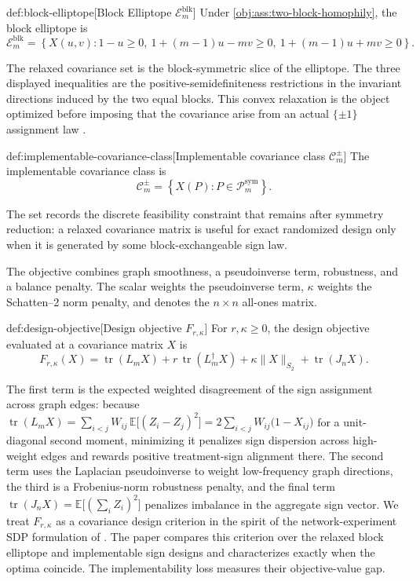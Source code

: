 \documentclass[11pt]{article}
\begin{document}
\begin{definitionv}{def:block-elliptope}[Block Elliptope \(\mathcal E_m^{\mathrm{blk}}\)]
Under \cref{obj:ass:two-block-homophily}, the block elliptope is
\[
\mathcal E_m^{\mathrm{blk}}
=
\left\{
X(u,v):
1-u\ge 0,\ 
1+(m-1)u-mv\ge 0,\ 
1+(m-1)u+mv\ge 0
\right\}.
\]
\end{definitionv}

The relaxed covariance set  is the block-symmetric slice of the elliptope. The three displayed inequalities are the positive-semidefiniteness restrictions in the invariant directions induced by the two equal blocks. This convex relaxation is the object optimized before imposing that the covariance arise from an actual \(\{\pm1\}\) assignment law \citep{boyd2004,thiyageswaran2026}.

\begin{definitionv}{def:implementable-covariance-class}[Implementable covariance class $\mathcal C_m^{\pm}$]
The implementable covariance class is
\[
\mathcal C_m^{\pm}
=
\left\{
X(P): P\in \mathcal P_m^{\mathrm{sym}}
\right\}.
\]
\end{definitionv}

The set  records the discrete feasibility constraint that remains after symmetry reduction: a relaxed covariance matrix is useful for exact randomized design only when it is generated by some block-exchangeable sign law.

The objective combines graph smoothness, a pseudoinverse term, robustness, and a balance penalty. The scalar \leanref{sym:r}{\ensuremath{r}} weights the pseudoinverse term, \(\kappa\) weights the Schatten--2 norm penalty, and \leanref{sym:J_n}{\ensuremath{J_n}} denotes the \(n\times n\) all-ones matrix.

\begin{definitionv}{def:design-objective}[Design objective $F_{r,\kappa}$]
For $r,\kappa\ge 0$, the design objective evaluated at a covariance matrix $X$ is
\[
F_{r,\kappa}(X)
=
\operatorname{tr}(L_m X)
+
r\,\operatorname{tr}(L_m^\dagger X)
+
\kappa \|X\|_{S_2}
+
\operatorname{tr}(J_n X).
\]
\end{definitionv}

The first term is the expected weighted disagreement of the sign assignment across graph edges: because $\operatorname{tr}(L_m X)=\sum_{i<j}W_{ij}\,\mathbb E\bigl[(Z_i-Z_j)^2\bigr]=2\sum_{i<j}W_{ij}\bigl(1-X_{ij}\bigr)$ for a unit-diagonal second moment, minimizing it penalizes sign dispersion across high-weight edges and rewards positive treatment-sign alignment there. The second term uses the Laplacian pseudoinverse to weight low-frequency graph directions, the third is a Frobenius-norm robustness penalty, and the final term $\operatorname{tr}(J_n X)=\mathbb E\bigl[(\sum_i Z_i)^2\bigr]$ penalizes imbalance in the aggregate sign vector. We treat $F_{r,\kappa}$ as a covariance design criterion in the spirit of the network-experiment SDP formulation of \citet{thiyageswaran2026}. The paper compares this criterion over the relaxed block elliptope and implementable sign designs and characterizes exactly when the optima coincide. The implementability loss measures their objective-value gap.
\end{document}

